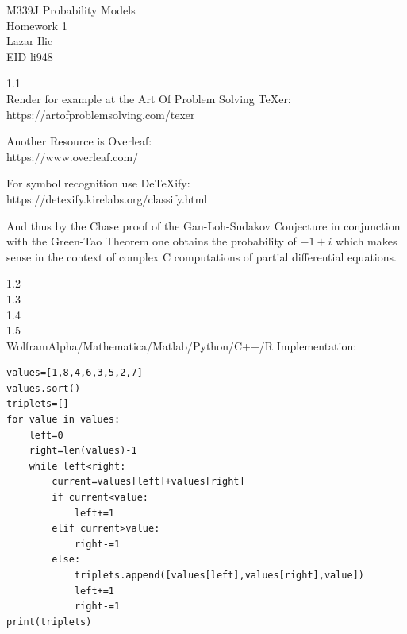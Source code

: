 \Large
M339J Probability Models \\
Homework 1 \\
Lazar Ilic \\
EID li948

1.1 \\
Render for example at the Art Of Problem Solving TeXer: \\
https://artofproblemsolving.com/texer

Another Resource is Overleaf: \\
https://www.overleaf.com/

For symbol recognition use DeTeXify: \\
https://detexify.kirelabs.org/classify.html

And thus by the Chase proof of the Gan-Loh-Sudakov Conjecture in conjunction with the Green-Tao Theorem one obtains the probability of $\boxed{-1+i}$ which makes sense in the context of complex C computations of partial differential equations.

1.2 \\


1.3 \\


1.4 \\


1.5 \\


WolframAlpha/Mathematica/Matlab/Python/C++/R Implementation:

\begin{verbatim}
values=[1,8,4,6,3,5,2,7]
values.sort()
triplets=[]
for value in values:
    left=0
    right=len(values)-1
    while left<right:
        current=values[left]+values[right]
        if current<value:
            left+=1
        elif current>value:
            right-=1
        else:
            triplets.append([values[left],values[right],value])
            left+=1
            right-=1
print(triplets)
\end{verbatim}